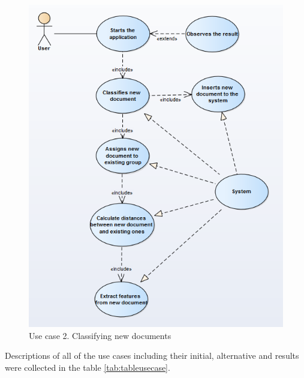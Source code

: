 \begin{figure}[H]
	\begin{center}
		\includegraphics[width=1.0\linewidth]{images/diagrams/use-case/classification.PNG}
		\caption{Use case 2. Classifying new documents}
		\label{design-use-case-2}
	\end{center}
\end{figure}
 
Descriptions of all of the use cases including their initial, alternative and results were collected in the table \ref{tab:tableusecase}.
\vspace{5em}

